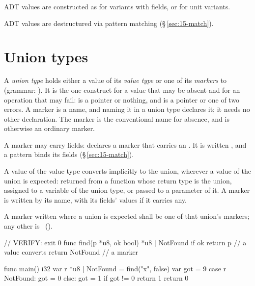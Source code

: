 \pnum
ADT values are constructed as  for
variants with fields, or  for unit variants.

\pnum
ADT values are destructured via  pattern matching
(\S\,\ref{sec:15-match}).

\section{Union types}
\label{sec:types.union}

\pnum
A \emph{union type}  holds either a value of its \emph{value type}
 or one of its \emph{markers}  to  (grammar: ).  It is
the one construct for a value that may be absent and for an operation that may fail:
 is a pointer or nothing, and  is a pointer or
one of two errors.  A marker is a name, and naming it in a union type declares it; it needs no
other declaration.  The marker  is the conventional name for absence, and is otherwise
an ordinary marker.

\pnum
A marker may carry fields:  declares a marker 
that carries an .  It is written , and a  pattern
 binds its fields (\S\,\ref{sec:15-match}).

\pnum
A value of the value type converts implicitly to the union, wherever a value of the union is
expected: returned from a function whose return type is the union, assigned to a variable of
the union type, or passed to a parameter of it.  A marker is written by its name, with its
fields' values if it carries any.

\begin{constraint}
  A marker written where a union is expected shall be one of that union's markers;
  any other is \illformed{}~().
\end{constraint}

\begin{laincode}
// VERIFY: exit 0
func find(p *u8, ok bool) *u8 | NotFound {
    if ok { return p }            // a value converts
    return NotFound               // a marker
}

func main() i32 {
    var r *u8 | NotFound = find("x", false)
    var got = 9
    case r {
        NotFound: got = 0
        else: got = 1
    }
    if got != 0 { return 1 }
    return 0
}
\end{laincode}

